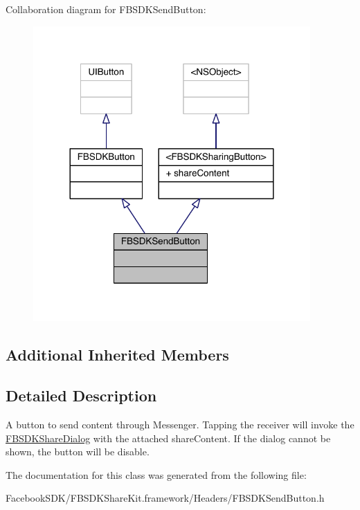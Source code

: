 Collaboration diagram for F\-B\-S\-D\-K\-Send\-Button\-:
\nopagebreak
\begin{figure}[H]
\begin{center}
\leavevmode
\includegraphics[width=300pt]{interface_f_b_s_d_k_send_button__coll__graph}
\end{center}
\end{figure}
\subsection*{Additional Inherited Members}


\subsection{Detailed Description}
A button to send content through Messenger.  Tapping the receiver will invoke the \hyperlink{interface_f_b_s_d_k_share_dialog}{F\-B\-S\-D\-K\-Share\-Dialog} with the attached share\-Content. If the dialog cannot be shown, the button will be disable. 

The documentation for this class was generated from the following file\-:\begin{DoxyCompactItemize}
\item 
Facebook\-S\-D\-K/\-F\-B\-S\-D\-K\-Share\-Kit.\-framework/\-Headers/F\-B\-S\-D\-K\-Send\-Button.\-h\end{DoxyCompactItemize}

